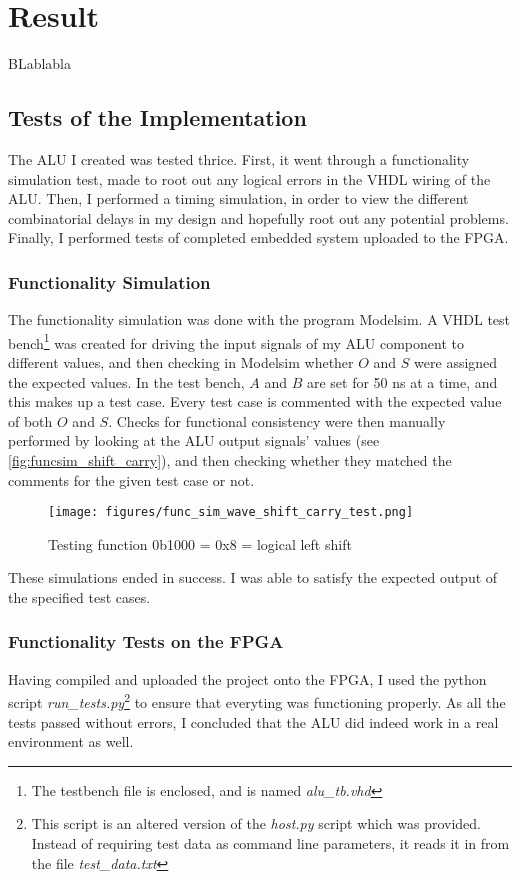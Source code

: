 \documentclass{article}
\begin{document}
\section{Result}
\label{sec:result}
BLablabla
\subsection{Tests of the Implementation}
\label{subsec:tests}
The ALU I created was tested thrice. First, it went through a functionality simulation test, made to root out any logical errors in the VHDL wiring of the ALU. Then, I performed a timing simulation, in order to view the different combinatorial delays in my design and hopefully root out any potential problems. Finally, I performed tests of completed embedded system uploaded to the FPGA. 
\subsubsection{Functionality Simulation}
\label{subsubsec:funcsim}
The functionality simulation was done with the program Modelsim. A VHDL test bench\footnote{The testbench file is enclosed, and is named \emph{alu\_tb.vhd}} was created for driving the input signals of my ALU component to different values, and then checking in Modelsim whether $O$ and $S$ were assigned the expected values. In the test bench, $A$ and $B$ are set for 50 ns at a time, and this makes up a test case. Every test case is commented with the expected value of both $O$ and $S$. Checks for functional consistency were then manually performed by looking at the ALU output signals' values (see \autoref{fig:funcsim_shift_carry}), and then checking whether they matched the comments for the given test case or not. 
\begin{figure}[htbp]
  \centering
  \texttt{[image: figures/func\_sim\_wave\_shift\_carry\_test.png]}
  \caption{\label{fig:funcsim_shift_carry} Testing function 0b1000 = 0x8 = logical left shift}
\end{figure}

These simulations ended in success. I was able to satisfy the expected output of the specified test cases.

\subsubsection{Functionality Tests on the FPGA}
\label{subsubsec:funcfpga}
Having compiled and uploaded the project onto the FPGA, I used the python script \emph{run\_tests.py}\footnote{This script is an altered version of the \emph{host.py} script which was provided. Instead of requiring test data as command line parameters, it reads it in from the file \emph{test\_data.txt}} to ensure that everyting was functioning properly. As all the tests passed without errors, I concluded that the ALU did indeed work in a real environment as well.
\end{document}
